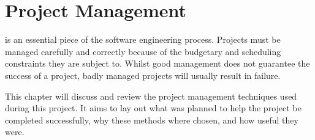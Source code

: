 \chapter[Project Management]{Project Management}
\label{ch:pm}


 is an essential piece of the software engineering process.
Projects must be managed carefully and correctly because of the budgetary and scheduling
constraints they are subject to. Whilst good management does not guarantee the success of
a project, badly managed projects will usually result in failure.

This chapter will discuss and review the project management techniques used during this project.
It aims to lay out what was planned to help the project be completed successfully, why
these methods where chosen, and how useful they were.

\clearpage
\clearpage
\clearpage
\clearpage
\clearpage
\clearpage
\clearpage
\clearpage
\clearpage
\clearpage
\clearpage
